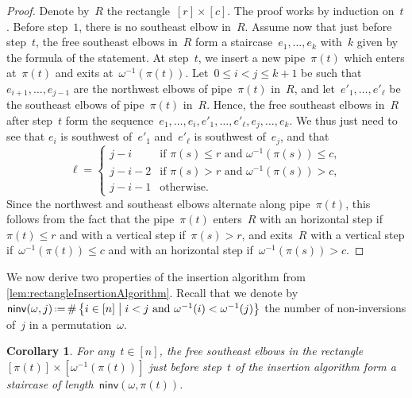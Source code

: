 \documentclass[reqno]{amsart}
\newtheorem{corollary}[theorem]{Corollary}
\theoremstyle{definition}
\newcommand{\set}[2]{\left\{ #1 \;\middle|\; #2 \right\}} %
\newcommand{\eqdef}{\mbox{\,\raisebox{0.2ex}{\scriptsize\ensuremath{\mathrm:}}\ensuremath{=}\,}} %
\newcommand{\noninversions}[2]{\mathsf{ninv}(#1,#2)} %
\begin{document}
\begin{proof}
Denote by~$R$ the rectangle~$[r] \times [c]$.
The proof works by induction on~$t$.
Before step~$1$, there is no southeast elbow in~$R$.
Assume now that just before step~$t$, the free southeast elbows in~$R$ form a staircase~$e_1, \dots, e_k$ with~$k$ given by the formula of the statement.
At step~$t$, we insert a new pipe~$\pi(t)$ which enters at~$\pi(t)$ and exits at~$\omega^{-1}(\pi(t))$.
Let~${0 \le i < j \le k+1}$ be such that~$e_{i+1}, \dots, e_{j-1}$ are the northwest elbows of pipe~$\pi(t)$ in~$R$, and let~$e'_1, \dots, e'_\ell$ be the southeast elbows of pipe~$\pi(t)$ in~$R$.
Hence, the free southeast elbows in~$R$ after step~$t$ form the sequence~$e_1, \dots, e_i, e'_1, \dots, e'_\ell, e_j, \dots, e_k$.
We thus just need to see that $e_i$ is southwest of~$e'_1$ and~$e'_\ell$ is southwest of~$e_j$, and that
\[
\ell = \begin{cases} j-i  & \text{if } \pi(s) \le r \text{ and } \omega^{-1}(\pi(s)) \le c, \\  j-i-2  & \text{if } \pi(s) > r \text{ and } \omega^{-1}(\pi(s)) > c, \\  j-i-1 & \text{otherwise.} \end{cases}
\]
Since the northwest and southeast elbows alternate along pipe~$\pi(t)$, this follows from the fact that the pipe~$\pi(t)$ enters~$R$ with an horizontal step if~$\pi(t) \le r$ and with a vertical step if~$\pi(s) > r$, and exits~$R$ with a vertical step if~$\omega^{-1}(\pi(t)) \le c$ and with an horizontal step if~$\omega^{-1}(\pi(s)) > c$.
\end{proof}

We now derive two properties of the insertion algorithm from \cref{lem:rectangleInsertionAlgorithm}.
Recall that we denote by~$\noninversions{\omega}{j} \eqdef \#\set{i \in [n]}{i < j \text{ and } \omega^{-1}(i) < \omega^{-1}(j)}$ the number of non-inversions of~$j$ in a permutation~$\omega$.

\begin{corollary}
\label{coro:rectangleInsertionAlgorithm1}
For any~$t \in [n]$, the free southeast elbows in the rectangle~$[\pi(t)] \times [\omega^{-1}(\pi(t))]$ just before step~$t$ of the insertion algorithm form a staircase of length~$\noninversions{\omega}{\pi(t)}$.
\end{corollary}
\end{document}
